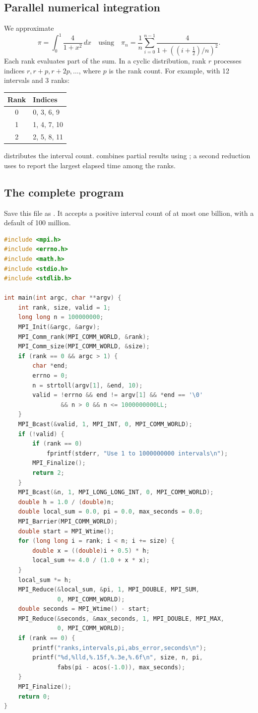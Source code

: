 \documentclass[11pt,a4paper]{article}
\newcommand{\cmd}[1]{\texttt{\detokenize{#1}}}
\begin{document}
\subsection{Parallel numerical integration}
We approximate
\[
\pi=\int_0^1\frac{4}{1+x^2}\,dx
\quad\text{using}\quad
\pi_n=\frac{1}{n}\sum_{i=0}^{n-1}
  \frac{4}{1+\left((i+\tfrac12)/n\right)^2}.
\]
Each rank evaluates part of the sum. In a cyclic distribution, rank \(r\)
processes indices \(r,r+p,r+2p,\ldots\), where \(p\) is the rank count.
For example, with 12 intervals and 3 ranks:
\begin{center}
\begin{tabular}{@{}cl@{}}
\toprule Rank & Indices \\
\midrule 0 & 0, 3, 6, 9 \\ 1 & 1, 4, 7, 10 \\ 2 & 2, 5, 8, 11 \\
\bottomrule
\end{tabular}
\end{center}
\cmd{MPI_Bcast} distributes the interval count. \cmd{MPI_Reduce} combines
partial results using \cmd{MPI_SUM}; a second reduction uses \cmd{MPI_MAX}
to report the largest elapsed time among the ranks.\cite{mpi-reduce}

\subsection{The complete program}
Save this file as \cmd{mpi_pi.c}. It accepts a positive interval count of
at most one billion, with a default of 100 million.
\begin{lstlisting}[language=C]
#include <mpi.h>
#include <errno.h>
#include <math.h>
#include <stdio.h>
#include <stdlib.h>

int main(int argc, char **argv) {
    int rank, size, valid = 1;
    long long n = 100000000;
    MPI_Init(&argc, &argv);
    MPI_Comm_rank(MPI_COMM_WORLD, &rank);
    MPI_Comm_size(MPI_COMM_WORLD, &size);
    if (rank == 0 && argc > 1) {
        char *end;
        errno = 0;
        n = strtoll(argv[1], &end, 10);
        valid = !errno && end != argv[1] && *end == '\0'
                && n > 0 && n <= 1000000000LL;
    }
    MPI_Bcast(&valid, 1, MPI_INT, 0, MPI_COMM_WORLD);
    if (!valid) {
        if (rank == 0)
            fprintf(stderr, "Use 1 to 1000000000 intervals\n");
        MPI_Finalize();
        return 2;
    }
    MPI_Bcast(&n, 1, MPI_LONG_LONG_INT, 0, MPI_COMM_WORLD);
    double h = 1.0 / (double)n;
    double local_sum = 0.0, pi = 0.0, max_seconds = 0.0;
    MPI_Barrier(MPI_COMM_WORLD);
    double start = MPI_Wtime();
    for (long long i = rank; i < n; i += size) {
        double x = ((double)i + 0.5) * h;
        local_sum += 4.0 / (1.0 + x * x);
    }
    local_sum *= h;
    MPI_Reduce(&local_sum, &pi, 1, MPI_DOUBLE, MPI_SUM,
               0, MPI_COMM_WORLD);
    double seconds = MPI_Wtime() - start;
    MPI_Reduce(&seconds, &max_seconds, 1, MPI_DOUBLE, MPI_MAX,
               0, MPI_COMM_WORLD);
    if (rank == 0) {
        printf("ranks,intervals,pi,abs_error,seconds\n");
        printf("%d,%lld,%.15f,%.3e,%.6f\n", size, n, pi,
               fabs(pi - acos(-1.0)), max_seconds);
    }
    MPI_Finalize();
    return 0;
}
\end{lstlisting}
\end{document}
